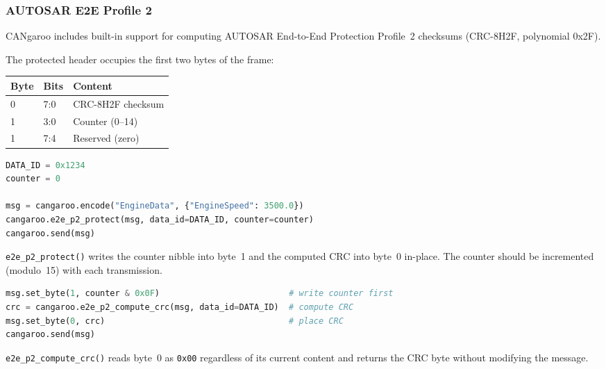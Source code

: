 \documentclass[a4paper,11pt]{article}
\begin{document}
\subsubsection{AUTOSAR E2E Profile 2}

CANgaroo includes built-in support for computing AUTOSAR End-to-End Protection
Profile~2 checksums (CRC-8H2F, polynomial 0x2F).

The protected header occupies the first two bytes of the frame:

\begin{table}[h]
  \centering
  \begin{tabularx}{0.7\textwidth}{llX}
    \toprule
    \textbf{Byte} & \textbf{Bits} & \textbf{Content} \\
    \midrule
    0 & 7:0 & CRC-8H2F checksum \\
    1 & 3:0 & Counter (0–14) \\
    1 & 7:4 & Reserved (zero) \\
    \bottomrule
  \end{tabularx}
\end{table}

\begin{lstlisting}[language=Python, caption={One-shot protect and send}]
DATA_ID = 0x1234
counter = 0

msg = cangaroo.encode("EngineData", {"EngineSpeed": 3500.0})
cangaroo.e2e_p2_protect(msg, data_id=DATA_ID, counter=counter)
cangaroo.send(msg)
\end{lstlisting}

\texttt{e2e\_p2\_protect()} writes the counter nibble into byte~1 and the computed
CRC into byte~0 in-place. The counter should be incremented (modulo~15) with each
transmission.

\begin{lstlisting}[language=Python, caption={Manual CRC placement}]
msg.set_byte(1, counter & 0x0F)                          # write counter first
crc = cangaroo.e2e_p2_compute_crc(msg, data_id=DATA_ID)  # compute CRC
msg.set_byte(0, crc)                                     # place CRC
cangaroo.send(msg)
\end{lstlisting}

\texttt{e2e\_p2\_compute\_crc()} reads byte~0 as \texttt{0x00} regardless of its
current content and returns the CRC byte without modifying the message.

\end{document}
